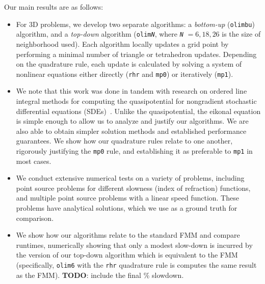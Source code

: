 \documentclass[eikonal.tex]{subfiles}
\begin{document}
Our main results are as follows:
\begin{itemize}
\item For 3D problems, we develop two separate algorithms: a
  \emph{bottom-up} (\texttt{olimbu}) algorithm, and a \emph{top-down}
  algorithm (\texttt{olim\emph{N}}, where \texttt{\emph{N}}
  \hspace{-0.1em}$=6,18,26$ is the size of neighborhood used). Each
  algorithm locally updates a grid point by performing a minimal
  number of triangle or tetrahedron updates. Depending on the
  quadrature rule, each update is calculated by solving a system of
  nonlinear equations either directly (\texttt{rhr} and \texttt{mp0})
  or iteratively (\texttt{mp1}).
\item We note that this work was done in tandem with research on
  ordered line integral methods for computing the quasipotential for
  nongradient stochastic differential equations
  (SDEs)~\cite{dahiya2017ordered,yang2018computing,dahiya2018ordered}. Unlike
  the quasipotential, the eikonal equation is simple enough to allow
  us to analyze and justify our algorithms. We are also able to obtain
  simpler solution methods and established performance guarantees. We
  show how our quadrature rules relate to one another, rigorously
  justifying the \texttt{mp0} rule, and establishing it as preferable
  to \texttt{mp1} in most cases.
\item We conduct extensive numerical tests on a variety of problems,
  including point source problems for different slowness (index of
  refraction) functions, and multiple point source problems with a
  linear speed function. These problems have analytical solutions,
  which we use as a ground truth for comparison.
\item We show how our algorithms relate to the standard FMM and
  compare runtimes, numerically showing that only a modest slow-down
  is incurred by the version of our top-down algorithm which is
  equivalent to the FMM (specifically, \texttt{olim6} with the
  \texttt{rhr} quadrature rule is computes the same result as the
  FMM). \textbf{TODO}: include the final \% slowdown.
\end{itemize}
\end{document}
